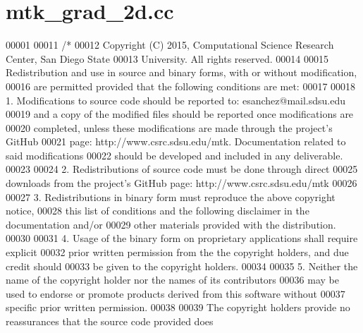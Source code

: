 \hypertarget{mtk__grad__2d_8cc_source}{\section{mtk\+\_\+grad\+\_\+2d.\+cc}
\label{mtk__grad__2d_8cc_source}
}

\begin{DoxyCode}
00001 
00011 \textcolor{comment}{/*}
00012 \textcolor{comment}{Copyright (C) 2015, Computational Science Research Center, San Diego State}
00013 \textcolor{comment}{University. All rights reserved.}
00014 \textcolor{comment}{}
00015 \textcolor{comment}{Redistribution and use in source and binary forms, with or without modification,}
00016 \textcolor{comment}{are permitted provided that the following conditions are met:}
00017 \textcolor{comment}{}
00018 \textcolor{comment}{1. Modifications to source code should be reported to: esanchez@mail.sdsu.edu}
00019 \textcolor{comment}{and a copy of the modified files should be reported once modifications are}
00020 \textcolor{comment}{completed, unless these modifications are made through the project's GitHub}
00021 \textcolor{comment}{page: http://www.csrc.sdsu.edu/mtk. Documentation related to said modifications}
00022 \textcolor{comment}{should be developed and included in any deliverable.}
00023 \textcolor{comment}{}
00024 \textcolor{comment}{2. Redistributions of source code must be done through direct}
00025 \textcolor{comment}{downloads from the project's GitHub page: http://www.csrc.sdsu.edu/mtk}
00026 \textcolor{comment}{}
00027 \textcolor{comment}{3. Redistributions in binary form must reproduce the above copyright notice,}
00028 \textcolor{comment}{this list of conditions and the following disclaimer in the documentation and/or}
00029 \textcolor{comment}{other materials provided with the distribution.}
00030 \textcolor{comment}{}
00031 \textcolor{comment}{4. Usage of the binary form on proprietary applications shall require explicit}
00032 \textcolor{comment}{prior written permission from the the copyright holders, and due credit should}
00033 \textcolor{comment}{be given to the copyright holders.}
00034 \textcolor{comment}{}
00035 \textcolor{comment}{5. Neither the name of the copyright holder nor the names of its contributors}
00036 \textcolor{comment}{may be used to endorse or promote products derived from this software without}
00037 \textcolor{comment}{specific prior written permission.}
00038 \textcolor{comment}{}
00039 \textcolor{comment}{The copyright holders provide no reassurances that the source code provided does}

\end{DoxyCode}
